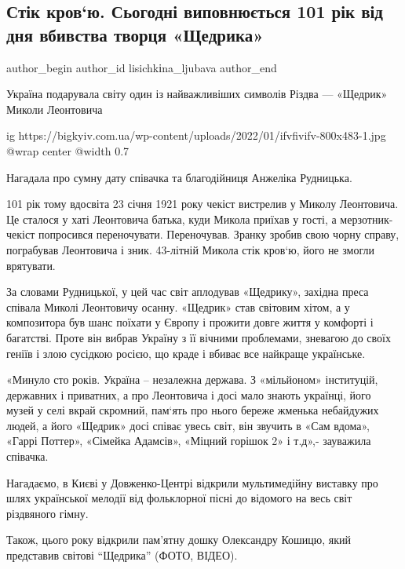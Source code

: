  
 
 
 
 
 
\subsection{Стік кров‘ю. Сьогодні виповнюється 101 рік від дня вбивства творця «Щедрика»}
\label{sec:23_01_2022.stz.kiev.bigkyiv.1.leontovich_murder}
 
\ifcmt
 author_begin
   author_id lisichkіna_ljubava
 author_end
\fi

\begin{zznagolos}
Україна подарувала світу один із найважливіших символів Різдва — «Щедрик»
Миколи Леонтовича
\end{zznagolos}

\ifcmt
  ig https://bigkyiv.com.ua/wp-content/uploads/2022/01/ifvfivifv-800x483-1.jpg
  @wrap center
  @width 0.7
\fi

Нагадала про сумну дату співачка та благодійниця Анжеліка Рудницька.
 
101 рік тому вдосвіта 23 січня 1921 року чекіст вистрелив у Миколу Леонтовича.
Це сталося у хаті Леонтовича батька, куди Микола приїхав у гості, а
мерзотник-чекіст попросився переночувати. Переночував. Зранку зробив свою чорну
справу, пограбував Леонтовича і зник.  43-літній Микола стік кров‘ю, його не
змогли врятувати.

За словами Рудницької, у цей час світ аплодував «Щедрику», західна преса
співала Миколі Леонтовичу осанну. «Щедрик» став світовим хітом, а у композитора
був шанс поїхати у Європу і прожити довге життя у комфорті і багатстві. Проте
він вибрав Україну з її вічними проблемами, зневагою до своїх геніїв і злою
сусідкою росією, що краде і вбиває все найкраще українське.
 
«Минуло сто років. Україна – незалежна держава. З «мільйоном» інституцій,
державних і приватних, а про Леонтовича і досі мало знають українці, його музей
у селі вкрай скромний, пам‘ять про нього береже жменька небайдужих людей, а
його «Щедрик» досі співає увесь світ, він звучить в «Сам вдома», «Гаррі
Поттер», «Сімейка Адамсів», «Міцний горішок 2» і т.д»,- зауважила співачка.
 
Нагадаємо, в Києві у Довженко-Центрі відкрили  мультимедійну виставку про шлях
української мелодії від фольклорної пісні до відомого на весь світ різдвяного
гімну.
 
Також, цього року відкрили пам’ятну дошку Олександру Кошицю, який представив
світові \enquote{Щедрика} (ФОТО, ВІДЕО).
